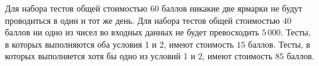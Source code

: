 Для набора тестов общей стоимостью $60$ баллов никакие две ярмарки не будут проводиться в один и тот же день.
Для набора тестов общей стоимостью $40$ баллов ни одно из чисел во входных данных не будет
превосходить $5\,000$.
Тесты, в которых выполняются оба условия 1 и 2, имеют стоимость $15$ баллов.
Тесты, в которых выполняется хотя бы одно из условий 1 и 2, имеют стоимость $85$ баллов.